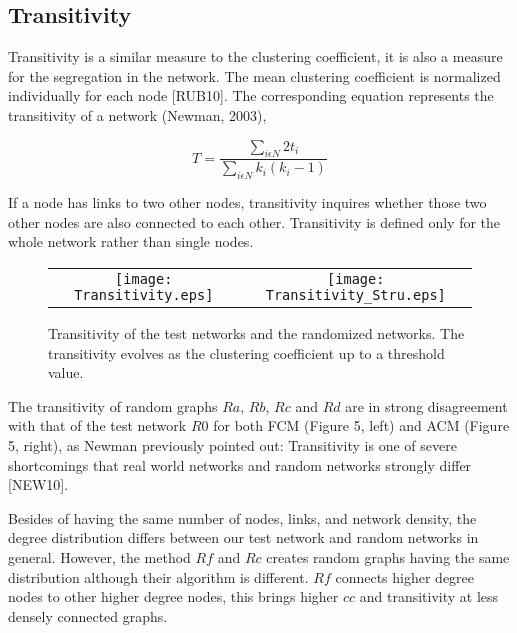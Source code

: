 \documentclass[12pt]{article}
\begin{document}
\subsection{Transitivity}
	Transitivity is a similar measure to the clustering coefficient, it is also a measure for the segregation in the network. The mean clustering coefficient is normalized individually for each node [RUB10]. The corresponding equation represents the transitivity of a network (Newman, 2003),
	
\begin{equation}
 T = \frac{\sum\limits_{i \epsilon N} 2 t_i}{\sum\limits_{i \epsilon N}k_i (k_i - 1)}
\end{equation}	

If a node has links to two other nodes, transitivity inquires whether those two other nodes are also connected to each other. Transitivity is defined only for the whole network rather than single nodes. 

\begin{figure}[htp]

  \centering

    \begin{tabular}{cc}


    \texttt{[image: Transitivity.eps]} &

    \texttt{[image: Transitivity\_Stru.eps]}\\

  \end{tabular}

 \label{figur}\caption{Transitivity of the test networks and the randomized networks. The transitivity evolves as the clustering coefficient up to a threshold value. }

\end{figure}

The transitivity of random graphs $Ra$, $Rb$, $Rc$ and $Rd$ are in strong disagreement with that of the test network $R0$ for both FCM (Figure 5, left) and ACM (Figure 5, right), as Newman previously pointed out: Transitivity is one of severe shortcomings that real world networks and random networks strongly differ [NEW10]. 

Besides of having the same number of nodes, links, and network density,  the degree distribution differs between our test network and random networks in general. However, the method $Rf$ and $Rc$ creates random graphs having the same distribution although their algorithm is different. $Rf$ connects higher degree nodes to other higher degree nodes, this brings higher $cc$ and transitivity at less densely connected graphs.  
\end{document}
